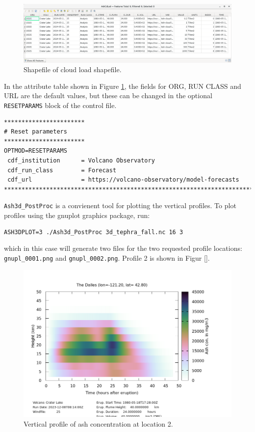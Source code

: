\begin{figure}[htbp]
\includegraphics[angle=0,scale=0.27]{Figures/Ash3dOutput_ShpAtrCloudLoad_QGIS.png}
\parbox{15cm}{\caption{\label{FigAsh3dAsh3dPP_shapeAtr}
Shapefile of cloud load shapefile.}}
\end{figure}

In the attribute table shown in Figure \ref{FigAsh3dAsh3dPP_shapeAtr}, the fields for
ORG, RUN CLASS and URL are the default values, but these can be changed in the
optional \texttt{RESETPARAMS} block of the control file.

\small
\begin{verbatim}
***********************
# Reset parameters
***********************
OPTMOD=RESETPARAMS
 cdf_institution      = Volcano Observatory
 cdf_run_class        = Forecast
 cdf_url              = https://volcano-observatory/model-forecasts
*******************************************************************************
\end{verbatim}
\normalsize

\texttt{Ash3d\_PostProc} is a convienent tool for plotting the vertical profiles.
To plot profiles using the gnuplot graphics package, run:
\small
\begin{verbatim}
ASH3DPLOT=3 ./Ash3d_PostProc 3d_tephra_fall.nc 16 3
\end{verbatim}
\normalsize
which in this case will generate two files for the two requested profile locations:
\texttt{gnupl\_0001.png} and \texttt{gnupl\_0002.png}. Profile 2 is shown in Figur
\ref{}.

\begin{figure}[htbp]
\includegraphics[angle=0,scale=0.5]{Figures/gnupl_0002.png}
\parbox{15cm}{\caption{\label{FigAsh3dAsh3dPP_vertprof}
Vertical profile of ash concentration at location 2.}}
\end{figure}

